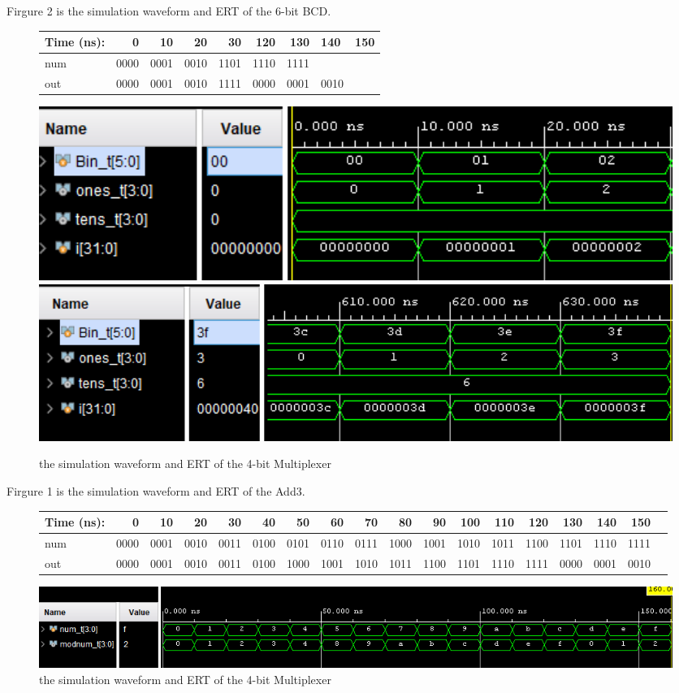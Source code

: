 \documentclass[11pt]{article}
\begin{document}
Firgure 2 is the simulation waveform and ERT of the 6-bit BCD.
\begin{figure}[ht]\centering
	\begin{tabular}{l|rrr|rrr}
		Time (ns): & 0 & 10 & 20 & 30 & 120 & 130 & 140 & 150 \\
		\midrule
		num & 0000 & 0001 & 0010 & 1101 & 1110 & 1111 \\
		\midrule
		out & 0000 & 0001 & 0010 & 1111 & 0000 & 0001 & 0010 \\
		\bottomrule
	\end{tabular}\medskip
	
	\includegraphics[width=1\textwidth]{bcd6_simulate_beginning}
	\includegraphics[width=1\textwidth]{bcd6_simulate_end}
	\caption{the simulation waveform and ERT of the 4-bit Multiplexer}
	\label{fig:add3_simulate}
\end{figure}


Firgure 1 is the simulation waveform and ERT of the Add3.
\begin{figure}[ht]\centering
	\begin{tabular}{l|rrrr|rrrr|rrrr|rrrr|r}
		Time (ns): & 0 & 10 & 20 & 30 & 40 & 50 & 60 & 70 & 80 & 90 & 100 & 110 & 120 & 130 & 140 & 150 \\
		\midrule
		num & 0000 & 0001 & 0010 & 0011 & 0100 & 0101 & 0110 & 0111 & 1000 & 1001 & 1010 & 1011 & 1100 & 1101 & 1110 & 1111 \\
		\midrule
		out & 0000 & 0001 & 0010 & 0011 & 0100 & 1000 & 1001 & 1010 & 1011 & 1100 & 1101 & 1110 & 1111 & 0000 & 0001 & 0010 \\
		\bottomrule
	\end{tabular}\medskip
	
	\includegraphics[width=1\textwidth]{add3_simulate}
	\caption{the simulation waveform and ERT of the 4-bit Multiplexer}
	\label{fig:add3_simulate}
\end{figure}
\end{document}
